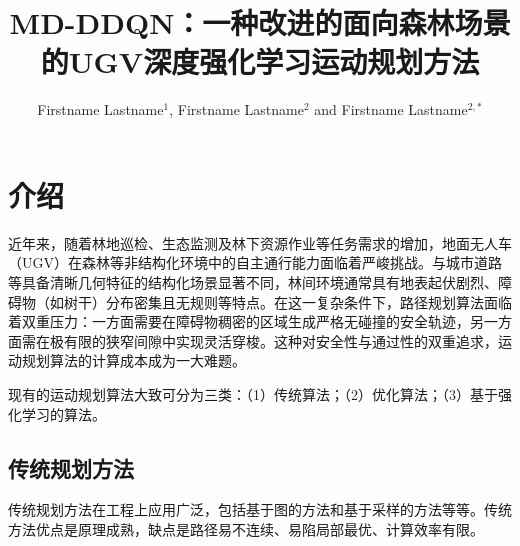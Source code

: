 \documentclass{iopjournal}
\begin{document}

\title{MD-DDQN：一种改进的面向森林场景的UGV深度强化学习运动规划方法}

\author{Firstname Lastname$^1$, Firstname Lastname$^2$ and Firstname Lastname$^{2,*}$}






\begin{abstract}

\end{abstract}

\section{介绍}\label{sec:intro}

近年来，随着林地巡检、生态监测及林下资源作业等任务需求的增加，地面无人车（UGV）在森林等非结构化环境中的自主通行能力面临着严峻挑战。与城市道路等具备清晰几何特征的结构化场景显著不同，林间环境通常具有地表起伏剧烈、障碍物（如树干）分布密集且无规则等特点。在这一复杂条件下，路径规划算法面临着双重压力：一方面需要在障碍物稠密的区域生成严格无碰撞的安全轨迹，另一方面需在极有限的狭窄间隙中实现灵活穿梭。这种对安全性与通过性的双重追求，运动规划算法的计算成本成为一大难题。

现有的运动规划算法大致可分为三类：（1）传统算法；（2）优化算法；（3）基于强化学习的算法。

\subsection{传统规划方法}

传统规划方法在工程上应用广泛，包括基于图的方法和基于采样的方法等等。传统方法优点是原理成熟，缺点是路径易不连续、易陷局部最优、计算效率有限。
\end{document}
